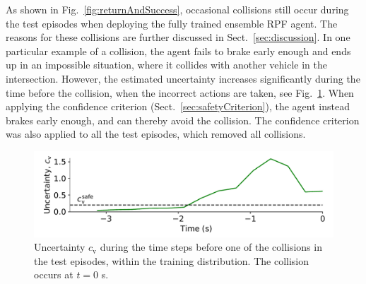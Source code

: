 As shown in Fig.~\ref{fig:returnAndSuccess}, occasional collisions still occur during the test episodes when deploying the fully trained ensemble RPF agent. The reasons for these collisions are further discussed in Sect.~\ref{sec:discussion}. In one particular example of a collision, the agent fails to brake early enough and ends up in an impossible situation, where it collides with another vehicle in the intersection. However, the estimated uncertainty increases significantly during the time before the collision, when the incorrect actions are taken, see Fig.~\ref{fig:cvDuringCrash}. When applying the confidence criterion (Sect.~\ref{sec:safetyCriterion}), the agent instead brakes early enough, and can thereby avoid the collision. The confidence criterion was also applied to all the test episodes, which removed all collisions.

\begin{figure}[!t]
	\centering
		\includegraphics[width=0.99\columnwidth]{figures/uncertainty_at_collision_wo_type_3_fonts.pdf}
		\caption{Uncertainty $c_\mathrm{v}$ during the time steps before one of the collisions in the test episodes, within the training distribution. The collision occurs at $t=0$ s.}
	\label{fig:cvDuringCrash}
\end{figure}



